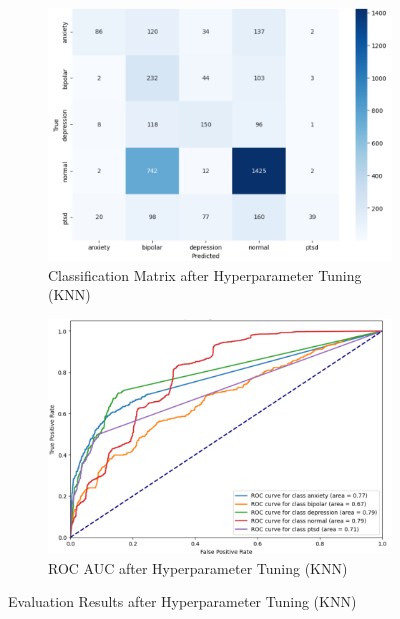 \begin{figure}[h!]
    \centering
    \begin{subfigure}[b]{0.49\textwidth}
        \centering
        \includegraphics[width=\textwidth]{Images/HP KNN CM.png}
        \caption{Classification Matrix after Hyperparameter Tuning (KNN)}
        \label{LSTMROC4}  %
    \end{subfigure}
    \hfill
    \begin{subfigure}[b]{0.49\textwidth}
        \centering
        \includegraphics[width=\textwidth]{Images/HP KNN ROC.png}
        \caption{ROC AUC after Hyperparameter Tuning (KNN)}
        \label{LSTMROC5}  %
    \end{subfigure}
    \caption{Evaluation Results after Hyperparameter Tuning (KNN)}
    \label{fig:hp_knn_comparison}
\end{figure}

